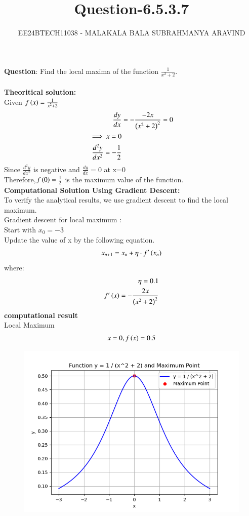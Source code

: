 \documentclass[journal]{IEEEtran}
\numberwithin{equation}{enumi}
\numberwithin{figure}{enumi}
\begin{document}

\title{Question-6.5.3.7}
\author{EE24BTECH11038 - MALAKALA BALA SUBRAHMANYA ARAVIND}
{\let\newpage\relax\maketitle}
\textbf{Question}:
Find the local maxima of the function $\frac{1}{x^2+2}$.\\
\solution \\
\textbf{Theoritical solution:}\\
Given $f\left(x\right)=\frac{1}{x^2+2}$
\begin{align}
    \frac{dy}{dx}&=-\frac{-2x}{\left(x^2+2\right)^2}=0\\
    \implies x=0\\
    \frac{d^2y}{dx^2} = -\frac{1}{2}\\  
\end{align}
Since $\frac{d^2y}{dx^2}$ is negative and $\frac{dy}{dx}=0$ at x=0\\
Therefore,$f\left(0\right)=\frac{1}{2}$ is the maximum value of the function.\\
\textbf{Computational Solution Using Gradient Descent:}\\
To verify the analytical results, we use gradient descent to find the local maximum. \\
Gradient descent for local maximum : \\ 
Start with $x_0=-3$\\
Update the value of x by the following equation. \\
\begin{align}
    x_{n+1}=x_n+\eta \cdot f^{\prime}\left(x_n\right)\\
\end{align}
where:
\begin{align}
    \eta=0.1\\
    f^{\prime}\left(x\right)=-\frac{2x}{\left(x^2+2\right)^2}
\end{align}
\textbf{computational result}\\
Local Maximum  
\begin{align}
    x=0,f\left(x\right)=0.5
\end{align}
\begin{figure}[h!]
	\centering
	\includegraphics[width=\columnwidth]{figs/Figure_1.png}
	\label{stemplot}
\end{figure}
\end{document}
